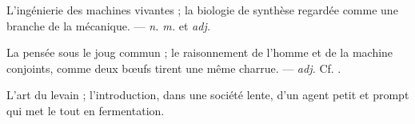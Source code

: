  L'ingénierie des machines vivantes ; la biologie de synthèse regardée comme une branche de la mécanique. ---  \textit{n. m.} et  \textit{adj.}

 La pensée sous le joug commun ; le raisonnement de l'homme et de la machine conjoints, comme deux bœufs tirent une même charrue. ---  \textit{adj.} Cf. .

 L'art du levain ; l'introduction, dans une société lente, d'un agent petit et prompt qui met le tout en fermentation.
